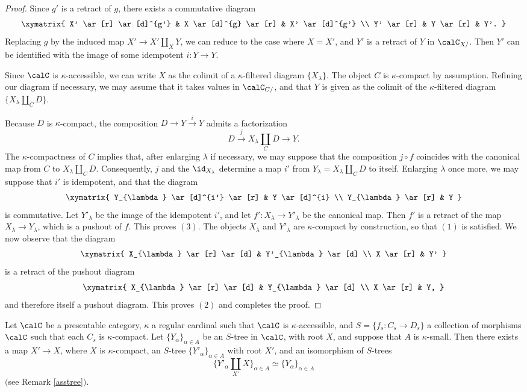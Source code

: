 \begin{proof}
Since $g'$ is a retract of $g$, there exists a commutative diagram
$$ \xymatrix{ X' \ar[r] \ar[d]^{g'} & X \ar[d]^{g} \ar[r] & X' \ar[d]^{g'} \\
Y' \ar[r] & Y \ar[r] & Y'. }$$
Replacing $g$ by the induced map $X' \rightarrow X' \coprod_{X} Y$, we can reduce to the case
where $X = X'$, and $Y'$ is a retract of $Y$ in $\calC_{X/}$. Then $Y'$ can be identified with
the image of some idempotent $i: Y \rightarrow Y$. 

Since $\calC$ is $\kappa$-accessible, we can write $X$ as the colimit of a $\kappa$-filtered
diagram $\{ X_{\lambda} \}$. The object $C$ is $\kappa$-compact by assumption. Refining our diagram if necessary, we may assume that it takes values in $\calC_{C/}$, and that $Y$ is
given as the colimit of the $\kappa$-filtered diagram $\{ X_{\lambda} \coprod_{C} D \}$. 

Because $D$ is $\kappa$-compact, the composition
$D \rightarrow Y \stackrel{i}{\rightarrow} Y$ admits a factorization
$$ D \stackrel{j}{\rightarrow} X_{\lambda} \coprod_{C} D \rightarrow Y.$$
The $\kappa$-compactness of $C$ implies that, after enlarging $\lambda$ if necessary, we may suppose that the composition $j \circ f$ coincides with the canonical map from $C$
to $X_{\lambda} \coprod_{C} D$. Consequently, $j$ and the $\id_{X_{\lambda}}$ determine
a map $i'$ from $Y_{\lambda} = X_{\lambda} \coprod_{C} D$ to itself. Enlarging $\lambda$ once more, we may suppose that $i'$ is idempotent, and that the diagram
$$ \xymatrix{ Y_{\lambda} \ar[d]^{i'} \ar[r] & Y \ar[d]^{i} \\
Y_{\lambda} \ar[r] & Y }$$
is commutative. Let $Y'_{\lambda}$ be the image of the idempotent $i'$, and let
$f': X_{\lambda} \rightarrow Y'_{\lambda}$ be the canonical map. Then $f'$ is a retract of the map
$X_{\lambda} \rightarrow Y_{\lambda}$, which is a pushout of $f$. This proves $(3)$. The objects
$X_{\lambda}$ and $Y'_{\lambda}$ are $\kappa$-compact by construction, so that $(1)$ is satisfied. We now observe that the diagram
$$ \xymatrix{ X_{\lambda} \ar[r] \ar[d] & Y'_{\lambda} \ar[d] \\
X \ar[r] & Y' }$$
is a retract of the pushout diagram
$$ \xymatrix{ X_{\lambda} \ar[r] \ar[d] & Y_{\lambda} \ar[d] \\
X \ar[r] & Y, }$$
and therefore itself a pushout diagram. This proves $(2)$ and completes the proof. 
\end{proof}

\begin{lemma}\label{tiura}
Let $\calC$ be a presentable category, $\kappa$ a regular cardinal such that $\calC$ is $\kappa$-accessible, and  $S = \{ f_s: C_s \rightarrow D_s \}$ a collection of morphisms $\calC$ such that each $C_s$ is $\kappa$-compact. Let $\{ Y_{\alpha} \}_{ \alpha \in A}$ be an $S$-tree in $\calC$,
with root $X$, and suppose that $A$ is $\kappa$-small. Then there exists a map
$X' \rightarrow X$, where $X$ is $\kappa$-compact, an $S$-tree
$\{ Y'_{\alpha} \}_{\alpha \in A}$ with root $X'$, and an isomorphism of $S$-trees
$$ \{ Y'_{\alpha} \coprod_{X'} X \}_{\alpha \in A} \simeq \{Y_{\alpha} \}_{\alpha \in A}$$
$($see Remark \ref{asstree}$)$. 
\end{lemma}

